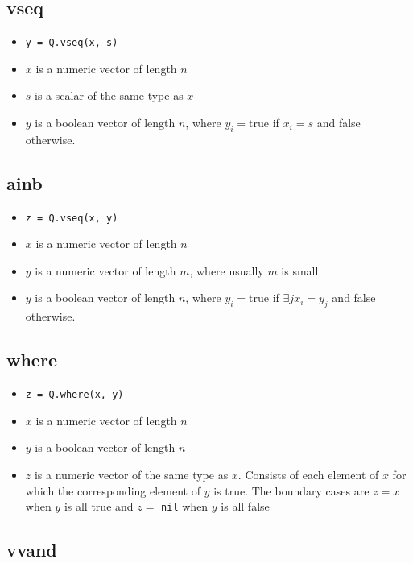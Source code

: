 \subsection{vseq}
\label{vseq}

\begin{itemize}
\item \verb+y = Q.vseq(x, s)+ 
\item \(x\) is a numeric vector of length \(n\)
\item \(s\) is a scalar of the same type as \(x\)
\item \(y\) is a boolean vector of length \(n\), where \(y_i = \mathrm{true}\)
if \(x_i = s\) and false otherwise.
\end{itemize}

\subsection{ainb}
\label{ainb}

\begin{itemize}
\item \verb+z = Q.vseq(x, y)+ 
\item \(x\) is a numeric vector of length \(n\)
\item \(y\) is a numeric vector of length \(m\), where usually \(m\) is small
\item \(y\) is a boolean vector of length \(n\), where \(y_i = \mathrm{true}\)
if \(\exists j x_i = y_j\) and false otherwise.
\end{itemize}


\subsection{where}
\label{where}

\begin{itemize}
\item \verb+z = Q.where(x, y)+ 
\item \(x\) is a numeric vector of length \(n\)
\item \(y\) is a boolean vector of length \(n\)
\item \(z\) is a numeric vector of the same type as \(x\). Consists of each
element of \(x\) for which the corresponding element of \(y\) is true. The
boundary cases are \(z = x\) when \(y\) is all true and \(z =\) {\tt nil} when
\(y\) is all false
\end{itemize}

\subsection{vvand}
\label{vvand}

